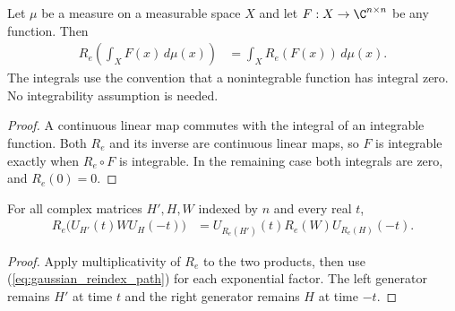 \begin{theorem}
    \label{thm:gaussian_reindex_integral}
    \leanok
    Let $\mu$ be a measure on a measurable space $X$ and let
    $F:X\to\C^{n\times n}$ be any function. Then
    \begin{align}
        R_e\!\left(\int_X F(x)\,d\mu(x)\right)
            &=\int_X R_e(F(x))\,d\mu(x).
        \label{eq:gaussian_reindex_integral}
    \end{align}
    The integrals use the convention that a nonintegrable function
    has integral zero. No integrability assumption is needed.
\end{theorem}
\begin{proof}\leanok
    A continuous linear map commutes with the integral of an integrable
    function. Both $R_e$ and its inverse are continuous linear maps, so
    $F$ is integrable exactly when $R_e\circ F$ is integrable. In the
    remaining case both integrals are zero, and $R_e(0)=0$.
\end{proof}

\begin{theorem}
    \label{thm:gaussian_reindex_integrand}
    \leanok
    For all complex matrices $H',H,W$ indexed by $n$ and every real $t$,
    \begin{align}
        R_e\bigl(U_{H'}(t)WU_H(-t)\bigr)
            &=U_{R_e(H')}(t)R_e(W)U_{R_e(H)}(-t).
        \label{eq:gaussian_reindex_integrand}
    \end{align}
\end{theorem}
\begin{proof}\leanok
    Apply multiplicativity of $R_e$ to the two products, then use
    (\ref{eq:gaussian_reindex_path}) for each exponential factor.
    The left generator remains $H'$ at time $t$ and the right generator
    remains $H$ at time $-t$.
\end{proof}

